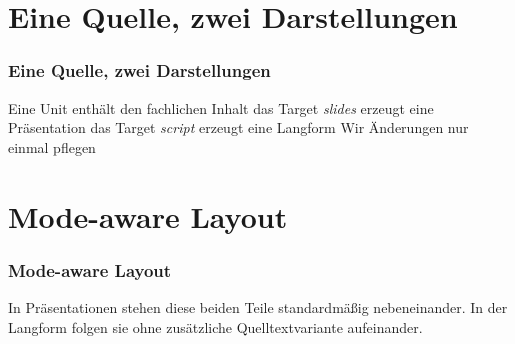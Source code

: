 \documentclass{osglecture}
\begin{document}

\section{Eine Quelle, zwei Darstellungen}
\begin{frame}
  \frametitle{Eine Quelle, zwei Darstellungen}
  \label{sec:shared-source}
  \begin{presitemize}
    \item Eine Unit enthält den fachlichen Inhalt
    \anditem das Target \emph{slides} erzeugt eine Präsentation
    \anditem das Target \emph{script} erzeugt eine Langform
    \thereforeitem Wir  Änderungen nur einmal pflegen
  \end{presitemize}
\end{frame}

\section{Mode-aware Layout}
\begin{frame}
  \frametitle{Mode-aware Layout}
  \begin{twocolumns}[t,.46]
    In Präsentationen stehen diese beiden Teile standardmäßig nebeneinander.
    \nextcolumn
    In der Langform folgen sie ohne zusätzliche Quelltextvariante aufeinander.
  \end{twocolumns}
\end{frame}
\end{document}
